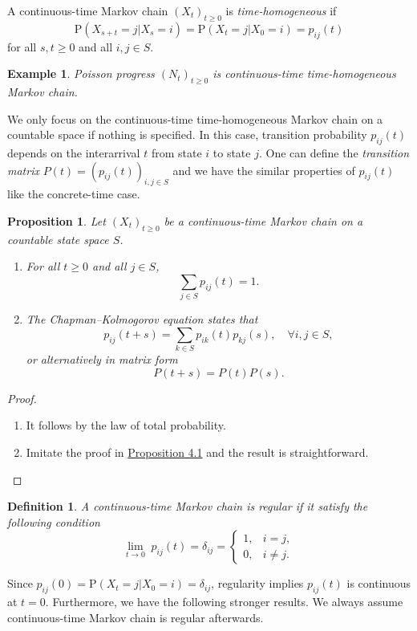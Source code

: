 \documentclass{report}
\newtheorem{definition}{Definition}[section]
\newtheorem{example}{Example}[section]
\newtheorem{proposition}{Proposition}[section]
\theoremstyle{nonumberplain}
\newtheorem{proof}{Proof.}
\begin{document}
\noindent A continuous-time Markov chain $(X_t)_{t\ge0}$ is \emph{time-homogeneous} if
\[
\mathrm{P}(X_{s+t}=j| X_{s}=i)=\mathrm{P}(X_{t}=j| X_{0}=i)=p_{ij}(t)
\]
for all $s,t\ge0$ and all $i,j\in S$. 
\begin{example}
	Poisson progress $(N_t)_{t\ge0}$ is continuous-time time-homogeneous Markov chain.
\end{example}
We only focus on the continuous-time time-homogeneous Markov chain on a countable space if nothing is specified.
In this case, transition probability $p_{ij}(t)$ depends on the interarrival $t$ from state $i$ to state $j$.
\noindent One can define the \emph{transition matrix}	$P(t)=(p_{ij}(t))_{i,j\in S}$ and we have the similar properties of $p_{ij}(t)$ like the concrete-time case.
\begin{proposition}
	Let $(X_t)_{t\ge0}$ be a continuous-time Markov chain on a countable state space $S$. 
	\begin{enumerate}
		\item For all $t\ge 0$ and all $j\in S$,
		\[
		\sum_{j\in S}p_{ij}(t)=1.
		\]
		\item The \emph{Chapman–Kolmogorov equation} states that
		\[
		p_{ij}(t+s)=\sum_{k\in S}p_{ik}(t)p_{kj}(s),\quad\forall i,j\in S,
		\]
		or alternatively in matrix form
		\[
		P(t+s)=P(t)P(s).
		\]
	\end{enumerate}
\end{proposition}
\begin{proof}\hspace{1em}
	\begin{enumerate}
	\item It follows by the law of total probability.
	\item Imitate the proof in \hyperlink{Proposition 4.1}{Proposition 4.1} and the result is straightforward.
	\end{enumerate} 
\end{proof}
\begin{definition}
A continuous-time Markov chain is \emph{regular} if it satisfy the following condition
\[
\lim_{t\to0}\;p_{ij}(t)=\delta_{ij}=
\begin{cases}
1,&i=j,\\
0,&i\ne j.
\end{cases}
\]
\end{definition}
Since $p_{ij}(0)=\mathrm{P}(X_{t}=j| X_{0}=i)=\delta_{ij}$, regularity implies $p_{ij}(t)$ is continuous at $t=0$. Furthermore, we have the following stronger results. We always assume continuous-time Markov chain is regular afterwards.
\end{document}
